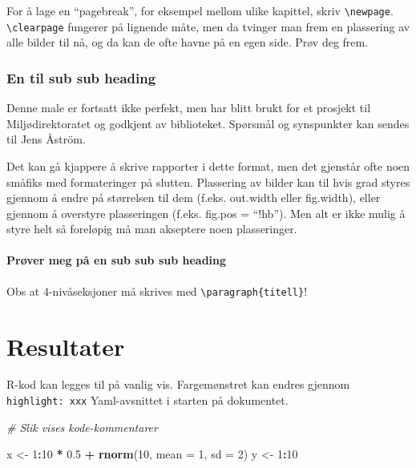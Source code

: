 \documentclass[11pt, a4paper]{article}
\newenvironment{Shaded}{\begin{snugshade}}{\end{snugshade}}
\newcommand{\AttributeTok}[1]{\textcolor[rgb]{0.13,0.29,0.53}{#1}}
\newcommand{\CommentTok}[1]{\textcolor[rgb]{0.56,0.35,0.01}{\textit{#1}}}
\newcommand{\DecValTok}[1]{\textcolor[rgb]{0.00,0.00,0.81}{#1}}
\newcommand{\FloatTok}[1]{\textcolor[rgb]{0.00,0.00,0.81}{#1}}
\newcommand{\FunctionTok}[1]{\textcolor[rgb]{0.13,0.29,0.53}{\textbf{#1}}}
\newcommand{\NormalTok}[1]{#1}
\newcommand{\OtherTok}[1]{\textcolor[rgb]{0.56,0.35,0.01}{#1}}
\newcommand{\SpecialCharTok}[1]{\textcolor[rgb]{0.81,0.36,0.00}{\textbf{#1}}}
\begin{document}
For å lage en ``pagebreak'', for eksempel mellom ulike kapittel, skriv
\texttt{\textbackslash{}newpage}. \texttt{\textbackslash{}clearpage}
fungerer på lignende måte, men da tvinger man frem en plassering av alle
bilder til nå, og da kan de ofte havne på en egen side. Prøv deg frem.

\hypertarget{en-til-sub-sub-heading}{%
\subsubsection{En til sub sub heading}\label{en-til-sub-sub-heading}}

Denne male er fortsatt ikke perfekt, men har blitt brukt for et prosjekt
til Miljødirektoratet og godkjent av biblioteket. Spørsmål og
synspunkter kan sendes til Jens Åström.

Det kan gå kjappere å skrive rapporter i dette format, men det gjenstår
ofte noen småfiks med formateringer på slutten. Plassering av bilder kan
til hvis grad styres gjennom å endre på størrelsen til dem (f.eks.
out.width eller fig.width), eller gjennom å overstyre plasseringen
(f.eks. fig.pos = ``!hb''). Men alt er ikke mulig å styre helt så
foreløpig må man akseptere noen plasseringer.

\paragraph{Prøver meg på en sub sub sub heading}

Obs at 4-nivåseksjoner må skrives med
\texttt{\textbackslash{}paragraph\{titell\}}!

\newpage

\hypertarget{res}{%
\section{Resultater}\label{res}}

R-kod kan legges til på vanlig vis. Fargemønstret kan endres gjennom
\texttt{highlight:\ xxx} Yaml-avsnittet i starten på dokumentet.

\begin{Shaded}
\begin{Highlighting}[]
\CommentTok{\# Slik vises kode{-}kommentarer}

\NormalTok{x }\OtherTok{\textless{}{-}} \DecValTok{1}\SpecialCharTok{:}\DecValTok{10} \SpecialCharTok{*} \FloatTok{0.5} \SpecialCharTok{+} \FunctionTok{rnorm}\NormalTok{(}\DecValTok{10}\NormalTok{, }\AttributeTok{mean =} \DecValTok{1}\NormalTok{, }\AttributeTok{sd =} \DecValTok{2}\NormalTok{)}
\NormalTok{y }\OtherTok{\textless{}{-}} \DecValTok{1}\SpecialCharTok{:}\DecValTok{10}
\end{Highlighting}
\end{Shaded}
\end{document}
